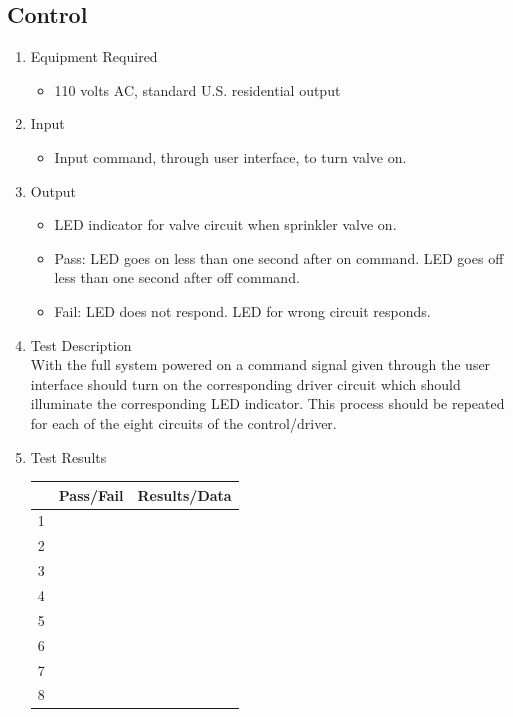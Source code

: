 \documentclass{article}
\begin{document}
\clearpage
\subsection{Control}

\begin{enumerate}
\item Equipment Required
	\begin{itemize}
	\item 110 volts AC, standard U.S. residential output
	\end{itemize}
\item Input
	\begin{itemize}
	\item Input command, through user interface, to turn valve on.
	\end{itemize}
\item Output
	\begin{itemize}
	\item LED indicator for valve circuit when sprinkler valve on.
	\item Pass: LED goes on less than one second after on command.
		LED goes off less than one second after off command.
	\item Fail: LED does not respond.  LED for wrong circuit responds.
	\end{itemize}
\item Test Description \\

With the full system powered on a command signal
given through the user interface should turn
on the corresponding driver circuit which should illuminate
the corresponding LED indicator.
This process should be repeated for each of the
eight circuits of the control/driver.

\item Test Results \\
	\vspace{0.2in}
	\begin{tabular}{|l|l|l|}
		\hline
		& Pass/Fail & Results/Data\hspace{2in} \\
		\hline
		1 && \\
		\hline
		2 && \\
		\hline
		3 && \\
		\hline
		4 && \\
		\hline
		5 && \\
		\hline
		6 && \\
		\hline
		7 && \\
		\hline
		8 && \\
		\hline
	\end{tabular}
\end{enumerate}
\end{document}
